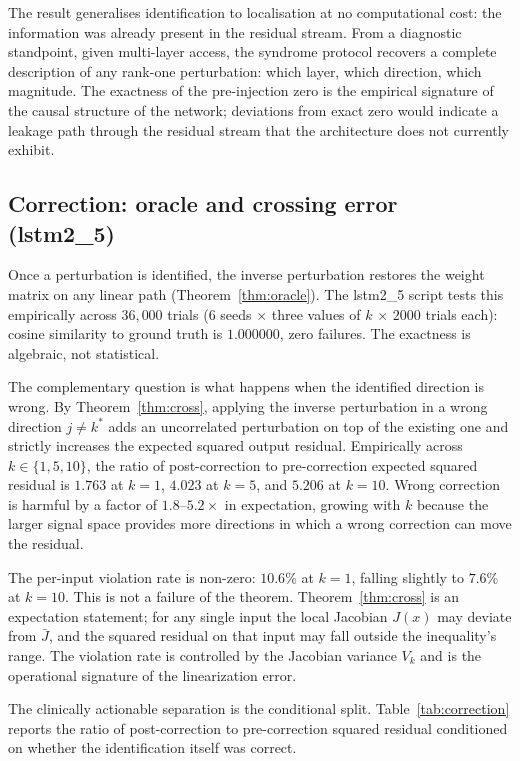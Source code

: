 \documentclass[11pt,a4paper]{article}
\newcommand{\Jbar}{\bar{J}}
\begin{document}
The result generalises identification to localisation at no computational cost: the information was already present in the residual stream. From a diagnostic standpoint, given multi-layer access, the syndrome protocol recovers a complete description of any rank-one perturbation: which layer, which direction, which magnitude. The exactness of the pre-injection zero is the empirical signature of the causal structure of the network; deviations from exact zero would indicate a leakage path through the residual stream that the architecture does not currently exhibit.


\subsection{Correction: oracle and crossing error (lstm2\_5)}
\label{sec:exp-correct}

Once a perturbation is identified, the inverse perturbation restores the weight matrix on any linear path (Theorem~\ref{thm:oracle}). The lstm2\_5 script tests this empirically across $36{,}000$ trials ($6$ seeds $\times$ three values of $k$ $\times$ $2000$ trials each): cosine similarity to ground truth is $1.000000$, zero failures. The exactness is algebraic, not statistical.

The complementary question is what happens when the identified direction is wrong. By Theorem~\ref{thm:cross}, applying the inverse perturbation in a wrong direction $j \neq k^*$ adds an uncorrelated perturbation on top of the existing one and strictly increases the expected squared output residual. Empirically across $k \in \{1, 5, 10\}$, the ratio of post-correction to pre-correction expected squared residual is $1.763$ at $k = 1$, $4.023$ at $k = 5$, and $5.206$ at $k = 10$. Wrong correction is harmful by a factor of $1.8$--$5.2\times$ in expectation, growing with $k$ because the larger signal space provides more directions in which a wrong correction can move the residual.

The per-input violation rate is non-zero: $10.6\%$ at $k = 1$, falling slightly to $7.6\%$ at $k = 10$. This is not a failure of the theorem. Theorem~\ref{thm:cross} is an expectation statement; for any single input the local Jacobian $J(x)$ may deviate from $\Jbar$, and the squared residual on that input may fall outside the inequality's range. The violation rate is controlled by the Jacobian variance $V_k$ and is the operational signature of the linearization error.

The clinically actionable separation is the conditional split. Table~\ref{tab:correction} reports the ratio of post-correction to pre-correction squared residual conditioned on whether the identification itself was correct.
\end{document}
